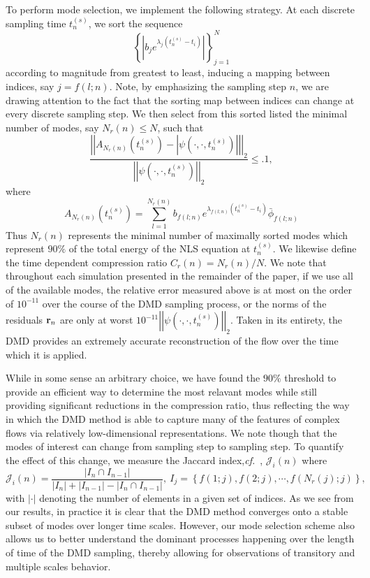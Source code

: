 \documentclass[aps,prl,preprint,groupedaddress]{revtex4-1}
\newcommand{\cf}{{\it cf.}~}
\newcommand{\gnorm}[1]{\left|\left| #1\right|\right|}
\begin{document}
To perform mode selection, we implement the following strategy.  At each discrete sampling time $t^{(s)}_{n}$, we sort the sequence 
\[
\left\{ \left|  b_{j}e^{\lambda_{j}(t_{n}^{(s)}-t_{i})} \right| \right\}_{j=1}^{N}
\]
according to magnitude from greatest to least, inducing a mapping between indices, say $j=f(l;n)$.  Note, by emphasizing the sampling step $n$, we are drawing attention to the fact that the sorting map between indices can change at every discrete sampling step.  We then select from this sorted listed the minimal number of modes, say $N_{r}(n)\leq N$, such that 
\[
\frac{\gnorm{A_{N_{r}(n)}\left(t^{(s)}_{n}\right) - \left|\psi(\cdot,\cdot,t^{(s)}_{n})\right|}_{2}}{\gnorm{\psi(\cdot,\cdot,t^{(s)}_{n})}_{2}} \leq .1,
\]
where
\[
A_{N_{r}(n)}\left(t^{(s)}_{n}\right) = \sum_{l=1}^{N_{r}(n)} b_{f(l;n)}e^{\lambda_{f(l;n)}(t^{(s)}_{n}-t_{i})} \bar{\phi}_{f(l;n)}
\]
Thus $N_{r}(n)$ represents the minimal number of maximally sorted modes which represent $90\%$ of the total energy of the NLS equation at $t^{(s)}_{n}$.  We likewise define the time dependent compression ratio $C_{r}(n)=N_{r}(n)/N$.  We note that throughout each simulation presented in the remainder of the paper, if we use all of the available modes, the relative error measured above is at most on the order of $10^{-11}$ over the course of the DMD sampling process, or the norms of the residuals ${\bf r}_{n}$ are only at worst $10^{-11}\gnorm{\psi(\cdot,\cdot,t^{(s)}_{n})}_{2}$.  Taken in its entirety, the DMD provides an extremely accurate reconstruction of the flow over the time which it is applied.  

While in some sense an arbitrary choice, we have found the $90\%$ threshold to provide an efficient way to determine the most relavant modes while still providing significant reductions in the compression ratio, thus reflecting the way in which the DMD method is able to capture many of the features of complex flows via relatively low-dimensional representations.  
We note though that the modes of interest can change from sampling step to sampling step.  To quantify the effect of this change, we measure the Jaccard index,\cf \cite{tan}, $\mathcal{J}_{i}(n)$ where
\[
\mathcal{J}_{i}(n) = \frac{\left|I_{n}\cap I_{n-1}\right|}{\left|I_{n}\right|+\left|I_{n-1}\right|-\left|I_{n}\cap I_{n-1}\right|}, ~ I_{j} = \left\{f(1;j),f(2;j),\cdots,f(N_{r}(j);j)\right\},
\] 
with $\left|\cdot\right|$ denoting the number of elements in a given set of indices.  As we see from our results, in practice it is clear that the DMD method converges onto a stable subset of modes over longer time scales.  However, our mode selection scheme also allows us to better understand the dominant processes happening over the length of time of the DMD sampling, thereby allowing for observations of transitory and multiple scales behavior.  
\end{document}
